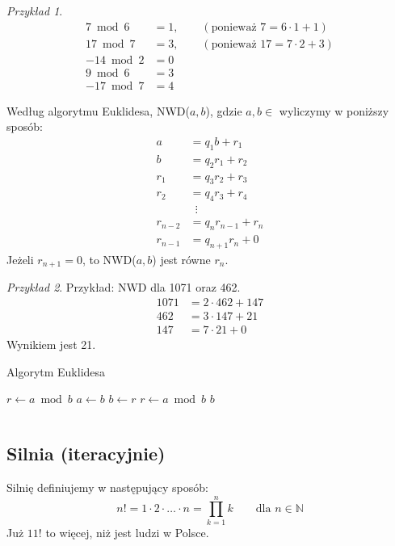 \documentclass[10pt, oneside]{article}
\theoremstyle{remark}
\newtheorem*{example}{Przykład}
\begin{document}
\begin{example}
\begin{align*}
7 \bmod 6 &= 1, \qquad (\text{ponieważ } 7 = 6 \cdot 1 + 1)\\
17 \bmod 7 &= 3, \qquad (\text{ponieważ } 17 = 7 \cdot 2 + 3)\\
-14 \bmod 2 &= 0\\
9 \bmod 6 &= 3\\
-17 \bmod 7 &= 4 
\end{align*}	
\end{example}


Według algorytmu Euklidesa, NWD($a,b$), gdzie $a, b \in $ wyliczymy w poniższy sposób: 
\begin{align*}
	a&=q_{1}b+r_{1}\\
	b&=q_{2}r_{1}+r_{2}\\
	r_{1}&=q_{3}r_{2}+r_{3}\\
	r_{2}&=q_{4}r_{3}+r_{4}\\
	&\,\,\,\vdots \\
	r_{n-2}&=q_{n}r_{n-1}+r_{n}\\
	r_{n-1}&=q_{n+1}r_{n}+0
\end{align*}
Jeżeli $r_{n+1}=0$, to NWD($a,b$) jest równe $r_{n}$.

\begin{example}
	Przykład: NWD dla 1071 oraz 462.
	\begin{align*}
		1071 &= 2 \cdot 462 + 147 \\
		462 &= 3 \cdot 147 + 21 \\
		147 &= 7 \cdot 21 + 0
	\end{align*}
	Wynikiem jest 21.
\end{example}


\begin{algorithm}
    \caption{Algorytm Euklidesa}
    \label{euclid}
    \begin{algorithmic}[1] %
            \State $r\gets a \bmod b$
                \State $a \gets b$
                \State $b \gets r$
                \State $r \gets a \bmod b$
            \EndWhile
            \State \Return $b$
        \EndFunction
    \end{algorithmic}
\end{algorithm}

\inputminted[linenos]{python}{code/2_euclid_iterative.py}

\subsection{Silnia (iteracyjnie)}
Silnię definiujemy w następujący sposób:
\begin{equation}
	n!= 1 \cdot 2 \cdot \ldots \cdot n = \prod _{k=1}^{n}k\qquad {\mbox{dla }}n\in \mathbb{N}
\end{equation}
Już $11!$ to więcej, niż jest ludzi w Polsce.
\inputminted[linenos]{python}{code/2_factorial_iterative.py}
\end{document}
